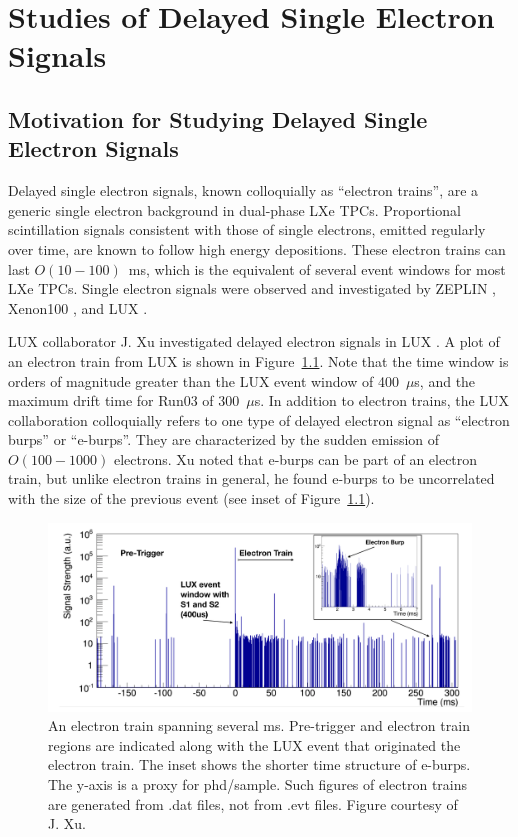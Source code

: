 \chapter{Studies of Delayed Single Electron Signals}
\label{ch:etrains} 

\section{Motivation for Studying Delayed Single Electron Signals}
Delayed single electron signals, known colloquially as ``electron trains'', are a generic single electron background in dual-phase \ac{LXe} \ac{TPC}s. Proportional scintillation signals consistent with those of single electrons, emitted regularly over time, are known to follow high energy depositions. These electron trains can last $O(10-100)$~ms, which is the equivalent of several event windows for most \ac{LXe} \ac{TPC}s. Single electron signals were observed and investigated by ZEPLIN \cite{Edwards2008} \cite{Santos2011}, Xenon100 \cite{Aprile2014}, and LUX \cite{Xu2016}. 

\ac{LUX} collaborator J. Xu investigated delayed electron signals in \ac{LUX} \cite{Xu2016}. A plot of an electron train from \ac{LUX} is shown in Figure~\ref{fig:lux_etrain}. Note that the time window is orders of magnitude greater than the \ac{LUX} event window of 400~$\mu$s, and the maximum drift time for Run03 of 300~$\mu$s. In addition to electron trains, the \ac{LUX} collaboration colloquially refers to one type of delayed electron signal as ``electron burps'' or ``e-burps''. They are characterized by the sudden emission of $O(100-1000)$ electrons. Xu noted that e-burps can be part of an electron train, but unlike electron trains in general, he found e-burps to be uncorrelated with the size of the previous event (see inset of Figure~\ref{fig:lux_etrain}). 

\begin{figure}[htbp]
\begin{center}
\includegraphics[width=\textwidth]{figures/etrains/lux_etrain_eburp.png}
\caption{An electron train spanning several ms. Pre-trigger and electron train regions are indicated along with the \ac{LUX} event that originated the electron train. The inset shows the shorter time structure of e-burps. The y-axis is a proxy for phd/sample. Such figures of electron trains are generated from .dat files, not from .evt files. Figure courtesy of J. Xu. }
\label{fig:lux_etrain}
\end{center}
\end{figure}



